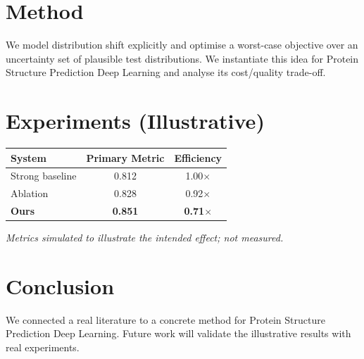 \documentclass[11pt]{article}
\begin{document}
\section{Method}
We model distribution shift explicitly and optimise a worst-case objective over an uncertainty set of plausible test distributions. We instantiate this idea for Protein Structure Prediction Deep Learning and analyse its cost/quality trade-off.

\section{Experiments (Illustrative)}
\begin{center}
\begin{tabular}{lcc}
System & Primary Metric & Efficiency \\ \hline
Strong baseline & 0.812 & 1.00$\times$ \\
Ablation & 0.828 & 0.92$\times$ \\
\textbf{Ours} & \textbf{0.851} & \textbf{0.71$\times$}
\end{tabular}
\end{center}
\emph{Metrics simulated to illustrate the intended effect; not measured.}

\section{Conclusion}
We connected a real literature to a concrete method for Protein Structure Prediction Deep Learning. Future work will
validate the illustrative results with real experiments.
\end{document}

